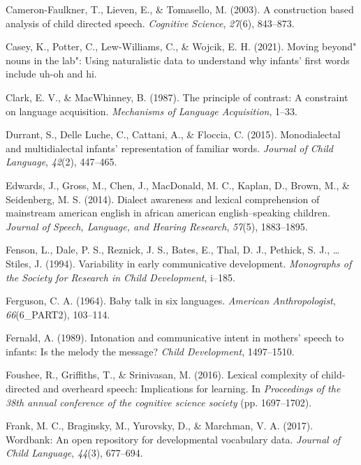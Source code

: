 \documentclass[10pt, letterpaper]{article}
\newenvironment{CSLReferences}%
  {}%
  {\par}
\begin{document}
\begin{CSLReferences}{1}{0}
\leavevmode\hypertarget{ref-cameron2003construction}{}%
Cameron-Faulkner, T., Lieven, E., \& Tomasello, M. (2003). A
construction based analysis of child directed speech. \emph{Cognitive
Science}, \emph{27}(6), 843--873.

\leavevmode\hypertarget{ref-caseyURmoving}{}%
Casey, K., Potter, C., Lew-Williams, C., \& Wojcik, E. H. (2021). Moving
beyond" nouns in the lab": Using naturalistic data to understand why
infants' first words include uh-oh and hi.

\leavevmode\hypertarget{ref-clark1987principle}{}%
Clark, E. V., \& MacWhinney, B. (1987). The principle of contrast: A
constraint on language acquisition. \emph{Mechanisms of Language
Acquisition}, 1--33.

\leavevmode\hypertarget{ref-durrant2015monodialectal}{}%
Durrant, S., Delle Luche, C., Cattani, A., \& Floccia, C. (2015).
Monodialectal and multidialectal infants' representation of familiar
words. \emph{Journal of Child Language}, \emph{42}(2), 447--465.

\leavevmode\hypertarget{ref-edwards2014dialect}{}%
Edwards, J., Gross, M., Chen, J., MacDonald, M. C., Kaplan, D., Brown,
M., \& Seidenberg, M. S. (2014). Dialect awareness and lexical
comprehension of mainstream american english in african american
english--speaking children. \emph{Journal of Speech, Language, and
Hearing Research}, \emph{57}(5), 1883--1895.

\leavevmode\hypertarget{ref-fenson1994variability}{}%
Fenson, L., Dale, P. S., Reznick, J. S., Bates, E., Thal, D. J.,
Pethick, S. J., \ldots{} Stiles, J. (1994). Variability in early
communicative development. \emph{Monographs of the Society for Research
in Child Development}, i--185.

\leavevmode\hypertarget{ref-ferguson1964baby}{}%
Ferguson, C. A. (1964). Baby talk in six languages. \emph{American
Anthropologist}, \emph{66}(6\_PART2), 103--114.

\leavevmode\hypertarget{ref-fernald1989intonation}{}%
Fernald, A. (1989). Intonation and communicative intent in mothers'
speech to infants: Is the melody the message? \emph{Child Development},
1497--1510.

\leavevmode\hypertarget{ref-foushee2016lexical}{}%
Foushee, R., Griffiths, T., \& Srinivasan, M. (2016). Lexical complexity
of child-directed and overheard speech: Implications for learning. In
\emph{Proceedings of the 38th annual conference of the cognitive science
society} (pp. 1697--1702).

\leavevmode\hypertarget{ref-frank2017wordbank}{}%
Frank, M. C., Braginsky, M., Yurovsky, D., \& Marchman, V. A. (2017).
Wordbank: An open repository for developmental vocabulary data.
\emph{Journal of Child Language}, \emph{44}(3), 677--694.


\end{CSLReferences}
\end{document}
